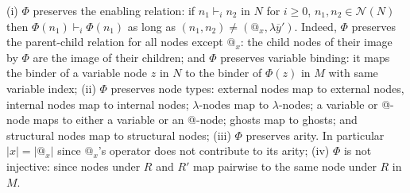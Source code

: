 \documentclass{elsarticle}
\theoremstyle{plain}
\theoremstyle{definition}
\newcommand\Nodes{\mathcal{N}}%
\newcommand{\enables}{\vdash} %
\begin{document}
%
    (i) $\Phi$ preserves the enabling relation: if $n_1 \enables_i n_2$ in $N$ for $i\geq 0$, $n_1,n_2 \in \Nodes(N)$ then $\Phi(n_1) \enables_i \Phi(n_1)$ as long as $(n_1,n_2) \neq (@_x,\lambda\overline{y}')$.
    Indeed, $\Phi$ preserves the parent-child relation for all nodes except $@_x$: the child nodes of their image by $\Phi$ are the image of their children;
    and $\Phi$ preserves variable binding: it maps the binder of a variable node $z$ in $N$ to the binder of $\Phi(z)$ in $M$ with same variable index;
%
    (ii) $\Phi$ preserves node types:
    external nodes map to external nodes,
    internal nodes map to internal nodes;
    $\lambda$-nodes map to $\lambda$-nodes;
    a variable or @-node maps to either a variable or an @-node;
    ghosts map to ghosts;
    and structural nodes map to structural nodes;
%
    (iii) $\Phi$ preserves arity. In particular $|x| = |@_x|$ since $@_x$'s operator does not contribute to its arity;
%
    (iv) $\Phi$ is not injective: since nodes under $R$ and $R'$
    map pairwise to the same node under $R$ in $M$.
\end{document}
